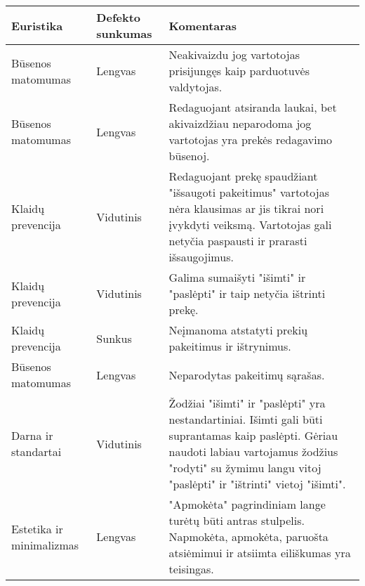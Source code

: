 \documentclass[oneside]{VUMIFPSkursinis}
\begin{document}
\begin{center}
	\begin{tabular}{ |p{3cm}| p{3cm} | p{11cm} | }
			\hline
			Euristika                    & Defekto sunkumas & Komentaras \\ \hline
			Būsenos matomumas            & Lengvas          &
				Neakivaizdu jog vartotojas prisijungęs kaip parduotuvės valdytojas.
				\\ \hline
			Būsenos matomumas            & Lengvas          &
				Redaguojant atsiranda laukai, bet akivaizdžiau neparodoma jog vartotojas yra prekės redagavimo būsenoj.
				\\ \hline
			Klaidų prevencija            & Vidutinis        &
				Redaguojant prekę spaudžiant "išsaugoti pakeitimus" vartotojas nėra klausimas ar jis tikrai nori įvykdyti veiksmą.
				Vartotojas gali netyčia paspausti ir prarasti išsaugojimus.
				\\ \hline
			Klaidų prevencija            & Vidutinis        &
				Galima sumaišyti "išimti" ir "paslėpti" ir taip netyčia ištrinti prekę.
				\\ \hline
			Klaidų prevencija            & Sunkus           &
				Neįmanoma atstatyti prekių pakeitimus ir ištrynimus.
				\\ \hline
			Būsenos matomumas            & Lengvas          &
				Neparodytas pakeitimų sąrašas.
				\\ \hline
			Darna ir standartai          & Vidutinis        &
				Žodžiai "išimti" ir "paslėpti" yra nestandartiniai.
				Išimti gali būti suprantamas kaip paslėpti.
				Gėriau naudoti labiau vartojamus žodžius "rodyti" su žymimu langu vitoj "paslėpti" ir "ištrinti" vietoj "išimti".
				\\ \hline
			Estetika ir minimalizmas     & Lengvas          &
				"Apmokėta" pagrindiniam lange turėtų būti antras stulpelis.
				Napmokėta, apmokėta, paruošta atsiėmimui ir atsiimta eiliškumas yra teisingas.
				\\ \hline
	\end{tabular}
\end{center}
\end{document}
